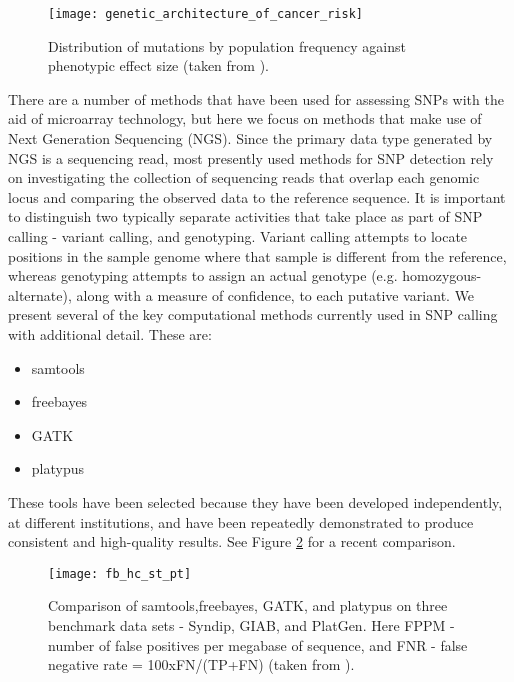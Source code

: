 \begin{figure}[h!]
    \texttt{[image: genetic\_architecture\_of\_cancer\_risk]}
    \centering
    \caption {Distribution of mutations by population frequency against phenotypic effect size (taken from \autocite{weitzel2011genetics}).}
    \label{fig:genetic_architecture_of_cancer_risk}
\end{figure}

There are a number of methods that have been used for assessing SNPs with the aid of microarray technology\autocite{heller2002dna}, but here we focus on methods that make use of Next Generation Sequencing (NGS). Since the primary data type generated by NGS is a sequencing read, most presently used methods for SNP detection rely on investigating the collection of sequencing reads that overlap each genomic locus and comparing the observed data to the reference sequence. It is important to distinguish two typically separate activities that take place as part of SNP calling - variant calling, and genotyping. Variant calling attempts to locate positions in the sample genome where that sample is different from the reference, whereas genotyping attempts to assign an actual genotype (e.g. homozygous-alternate), along with a measure of confidence, to each putative variant. We present several of the key computational methods currently used in SNP calling with additional detail. These are:

\begin{itemize}
    \item samtools
    \item freebayes
    \item GATK
    \item platypus
\end{itemize}

These tools have been selected because they have been developed independently, at different institutions, and have been repeatedly demonstrated to produce consistent and high-quality results. See Figure \ref{fig:fb_hc_st_pt} for a recent comparison.

\begin{figure}[h!]
    \texttt{[image: fb\_hc\_st\_pt]}
    \centering
    \caption {Comparison of samtools,freebayes, GATK, and platypus on three benchmark data sets - Syndip, GIAB, and PlatGen. Here FPPM - number of false positives per megabase of sequence, and FNR - false negative rate = 100xFN/(TP+FN) (taken from \autocite{li2018synthetic}).}
    \label{fig:fb_hc_st_pt}
\end{figure}

